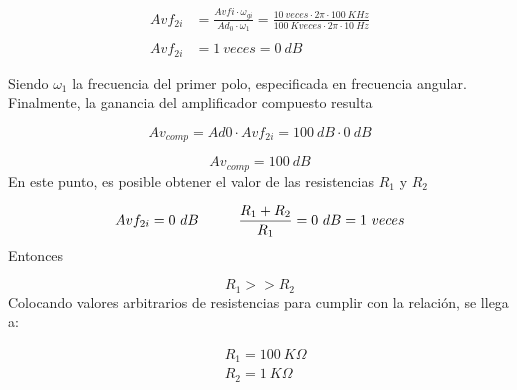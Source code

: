 \documentclass[a4paper,12pt]{article}
\begin{document}
\begin{align}
    Avf_{2i}&=\frac{Avfi \cdot \omega_{gi}}{Ad_0 \cdot \omega_1} =\frac{10~veces \cdot 2\pi\cdot 100 ~KHz}{100~Kveces\cdot 2\pi\cdot10~Hz} \label{eq:primera} \\
   \nonumber
   \\
    Avf_{2i}&=1~veces =0~dB
\end{align}

\vspace{0,2cm}
\hspace{1mm}Siendo $ \omega _1 $ la frecuencia del primer polo, especificada en frecuencia angular. Finalmente, la ganancia del amplificador compuesto resulta

\begin{equation}
    Av_{comp}=Ad0\cdot Avf_{2i}=100~dB \cdot 0~dB
\end{equation}

\begin{equation}
    \boxed{
    Av_{comp} = 100~dB
    }
\end{equation}
\vspace{0,2cm}
\hspace{1mm}En este punto, es posible obtener el valor de las resistencias $R_1$ y $R_2$

\begin{equation}
    Avf_{2i}=0~dB \hspace{5mm}\hspace{5mm} \frac{R_1+R_2}{R_1}=0~dB = 1~veces
\end{equation}
\vspace{0,2cm}
\hspace{1mm}Entonces

\begin{equation}
    R_1>>R_2
\end{equation}
\vspace{0,2cm}
\hspace{1mm}Colocando valores arbitrarios de resistencias para cumplir con la relación, se llega a:

\begin{equation}
    \boxed{
    \begin{aligned}
        &R_1=100~K\Omega \\
        &R_2=1~K\Omega
    \end{aligned}
    }
\end{equation}
\end{document}
